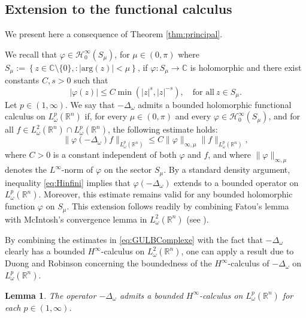 \documentclass[12pt, letterpaper]{amsart}
\newtheorem{lem}[thm]{Lemma}
\theoremstyle{definition}
\theoremstyle{remark}
\numberwithin{equation}{section}
\begin{document}
{\subsection{Extension to the functional calculus}\label{sec:bhfc}

We present here a consequence of Theorem \ref{thm:principal}.

We recall that $\varphi \in \mathcal{H}^\infty_0(S_\mu)$, for $\mu \in (0, \pi)$ where $S_{\mu} := \left\{ z \in \mathbb{C} \setminus \{0\} , : |\mathrm{arg}(z)| < \mu \right\}$, if $\varphi: S_{\mu} \rightarrow \mathbb{C}$ is holomorphic and there exist constants $C, s > 0$ such that
\begin{equation*}
    |\varphi(z)| \leq C \min(|z|^s, |z|^{-s}), \quad \text{for all} \ z \in S_\mu.
\end{equation*}
Let $p \in (1, \infty)$. We say that $-\Delta_\omega$ admits a bounded holomorphic functional calculus on $L^p_\omega(\mathbb{R}^n)$ if, for every $\mu \in (0, \pi)$ and every $\varphi \in \mathcal{H}^\infty_0(S_\mu)$, and for all $f \in L^2_\omega(\mathbb{R}^n) \cap L^p_\omega(\mathbb{R}^n)$, the following estimate holds:
\begin{equation}\label{eq:Hinfini}
    \| \varphi(-\Delta_\omega)f \|_{L^p_\omega(\mathbb{R}^n)} \leq C \| \varphi \|_{\infty,\mu} \| f \|_{L^p_\omega(\mathbb{R}^n)},
\end{equation}
where $C > 0$ is a constant independent of both $\varphi$ and $f$, and where $\| \varphi \|_{\infty,\mu}$ denotes the $L^\infty$-norm of $\varphi$ on the sector $S_\mu$. By a standard density argument, inequality \eqref{eq:Hinfini} implies that $\varphi(-\Delta_\omega)$ extends to a bounded operator on $L^p_\omega(\mathbb{R}^n)$. Moreover, this estimate remains valid for any bounded holomorphic function $\varphi$ on $S_\mu$. This extension follows readily by combining Fatou's lemma with McIntosh’s convergence lemma in $L^2_\omega(\mathbb{R}^n)$ (see \cite{McIntosh86}).

By combining the estimates in \eqref{eq:GULBComplexe} with the fact that $-\Delta_\omega$ clearly has a bounded $H^\infty$-calculus on $L^2_\omega(\mathbb{R}^n)$, one can apply a result due to Duong and Robinson \cite[Theorem 3.1]{duong1996semigroup} concerning the boundedness of the $H^\infty$-calculus of $-\Delta_\omega$ on $L^p_\omega(\mathbb{R}^n)$.
\begin{lem}\label{lem:DR}
    The operator $-\Delta_\omega$ admits a bounded $H^\infty$-calculus on $L^p_\omega(\mathbb{R}^n)$ for each $p \in (1,\infty)$.
\end{lem}

}
\end{document}

